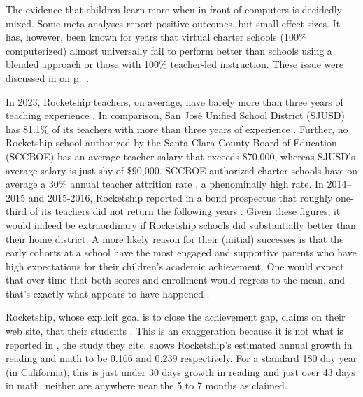 The evidence that children learn more when in front of computers is decidedly mixed. Some meta-analyses report positive outcomes, but small effect sizes. It has, however, been known for years that virtual charter schools (100\% computerized) almost universally fail to perform better than schools using a blended approach or those with 100\% teacher-led instruction. These issue were discussed in  on p.~\pageref{sec:types-instruction}.


In 2023, Rocketship teachers, on average, have barely more than three years of teaching experience \parencite{SCCOE14-23}. In comparison, San José Unified School District (SJUSD) has 81.1\% of its teachers with more than three years of experience \parencite{USNews2023}. Further, no Rocketship school authorized by the Santa Clara County Board of Education (SCCBOE) has an average teacher salary that exceeds \$70,000, whereas SJUSD's average salary is just shy of \$90,000. SCCBOE-authorized charter schools have on average a 30\% annual teacher attrition rate \parencite{SCCOE14-23}, a phenominally high rate. In 2014–2015 and 2015-2016, Rocketship reported in a bond prospectus that roughly one-third of its teachers did not return the following years \parencite{CSFA2017}. Given these figures, it would indeed be extraordinary if Rocketship schools did substantially better than their home district. A more likely reason for their (initial) successes is that the early cohorts at a school have the most engaged and supportive parents who have high expectations for their children's academic achievement. One would expect that over time that both scores and enrollment would regress to the mean, and that's exactly what appears to have happened \parencite{SCCOE14-23}. 

Rocketship, whose explicit goal is to close the achievement gap, claims on their web site, that their students . This is an exaggeration because it is not what is reported in \textcite{Raymond.etal2023}, the study they cite. \textcite[132]{Raymond.etal2023} shows Rocketship's estimated annual growth in reading and math to be 0.166 and 0.239 respectively. For a standard 180 day year (in California), this is just under 30 days growth in reading and just over 43 days in math, neither are anywhere near the 5 to 7 months as claimed.


